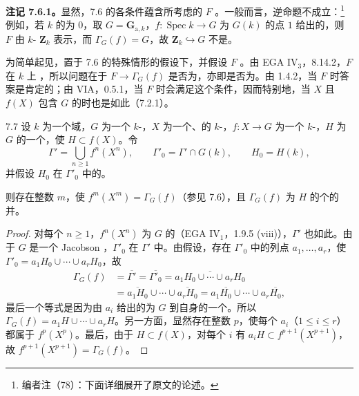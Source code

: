 \textbf{注记 7.6.1。}显然，7.6 的各条件蕴含所考虑的 $F$ 。一般而言，逆命题不成立：\footnote{编者注（78）：下面详细展开了原文的论述。}例如，若 $k$ 的为 $0$，取 $G=\mathbf G_{\mathrm a,k}$，$f:\operatorname{Spec}k\to G$ 为 $G(k)$ 的点 $1$ 给出的，则 $F$ 由 $k$- $\mathbf Z_k$ 表示，而 $\Gamma_G(f)=G$，故 $\mathbf Z_k\hookrightarrow G$ 不是。

为简单起见，置于 7.6 的特殊情形的假设下，并假设 $F$ 。由 EGA $\mathrm{IV}_3$，8.14.2，$F$ 在 $k$ 上
，所以问题在于 $F\to\Gamma_G(f)$ 是否为，亦即是否为。由 1.4.2，当 $F$ 时答案是肯定的；由 VIA，0.5.1，当 $F$ 时会满足这个条件，因而特别地，当 $X$ 且 $f(X)$ 包含 $G$ 的时也是如此（7.2.1）。

\begin{SGAresult}{}{7.7}
设 $k$ 为一个域，$G$ 为一个 $k$-，$X$ 为一个、的 $k$-，$f:X\to G$ 为一个 $k$-，$H$ 为 $G$ 的一个，使 $H\subset f(X)$。令
\[
\Gamma'=\bigcup_{n\geq1}f^n(X^n),\qquad
\Gamma'_0=\Gamma'\cap G(k),\qquad H_0=H(k),
\]
并假设 $H_0$ 在 $\Gamma'_0$ 中的。

则存在整数 $m$，使 $f^m(X^m)=\Gamma_G(f)$（参见 7.6），且 $\Gamma_G(f)$ 为 $H$ 的个的并。
\end{SGAresult}
\begin{proof}
对每个 $n\geq1$，$f^n(X^n)$ 为 $G$ 的（EGA $\mathrm{IV}_1$，1.9.5 (viii)），$\Gamma'$ 也如此。由于 $G$ 是一个 Jacobson ，$\Gamma'_0$ 在 $\Gamma'$ 中。由假设，存在 $\Gamma'_0$ 中的列点 $a_1,\ldots,a_r$，使 $\Gamma'_0=a_1H_0\cup\cdots\cup a_rH_0$，故
\[
\begin{aligned}
\Gamma_G(f)&=\overline{\Gamma'}=\overline{\Gamma'_0}
=\overline{a_1H_0\cup\cdots\cup a_rH_0}\\
&=\overline{a_1H_0}\cup\cdots\cup\overline{a_rH_0}
=a_1\overline{H_0}\cup\cdots\cup a_r\overline{H_0},
\end{aligned}
\]
最后一个等式是因为由 $a_i$ 给出的为 $G$ 到自身的一个。所以 $\Gamma_G(f)=a_1H\cup\cdots\cup a_rH$。另一方面，显然存在整数 $p$，使每个 $a_i$（$1\leq i\leq r$）都属于 $f^p(X^p)$。最后，由于 $H\subset f(X)$，对每个 $i$ 有 $a_iH\subset f^{p+1}(X^{p+1})$，故 $f^{p+1}(X^{p+1})=\Gamma_G(f)$。
\end{proof}

